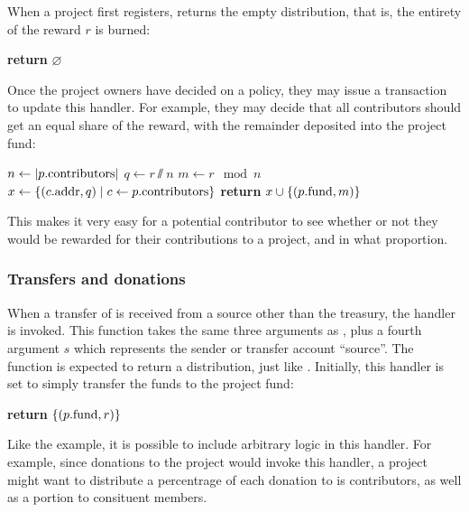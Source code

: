 When a project first registers,  returns the empty
distribution, that is, the entirety of the reward $r$ is burned:
\begin{algorithmic}[0]
        \State \textbf{return} $\varnothing$
    \EndProcedure
\end{algorithmic}

\noindent Once the project owners have decided on a policy, they may issue a
transaction to update this handler. For example, they may decide that all
contributors should get an equal share of the reward, with the remainder
deposited into the project fund:


\begin{algorithmic}[0]
        \State $n \gets |p.{\mathrm{contributors}}|$
        \State $q \gets r \sslash n$
        \State $m \gets r \mod n$
        \State $x \gets \{ (c.{\mathrm{addr}}, q) \mid c \gets p.{\mathrm{contributors}} \}$
        \State \textbf{return} $x \cup \{ (p.{\mathrm{fund}}, m) \}$
    \EndProcedure
\end{algorithmic}
This makes it very easy for a potential contributor to see whether or not they
would be rewarded for their contributions to a project, and in what proportion.

\subsubsection{Transfers and donations}

When a transfer of \oscoin{} is received from a source other than the treasury,
the  handler is invoked. This function takes the same
three arguments as , plus a fourth argument $s$ which
represents the sender or transfer account ``source''. The function is
expected to return a distribution, just like . Initially,
this handler is set to simply transfer the funds to the project fund:
\medskip
\begin{algorithmic}[0]
        \State \textbf{return} $\{ (p.{\mathrm{fund}}, r) \}$
    \EndProcedure
\end{algorithmic}
Like the  example, it is possible to include
arbitrary logic in this handler. For example, since donations to the project
would invoke this handler, a project might want to distribute a percentrage
of each donation to is contributors, as well as a portion to consituent members.

